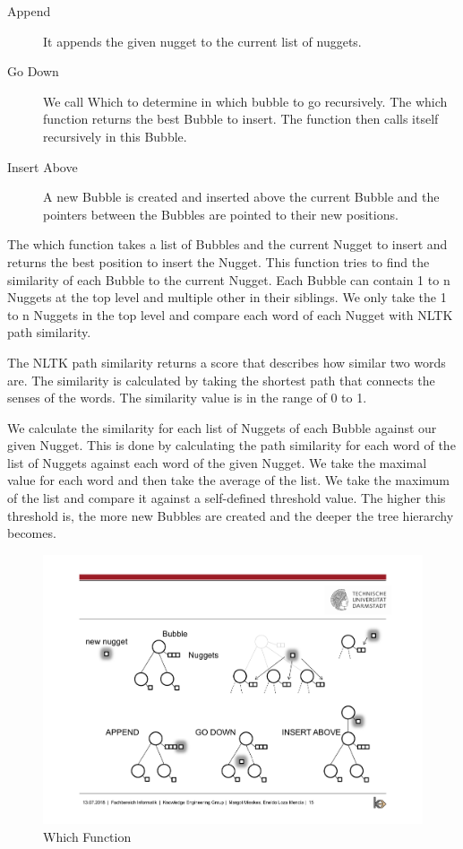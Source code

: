 \begin{description}
\item [Append] It appends the given nugget to the current list of nuggets.
\item [Go Down] We call Which to determine in which bubble to go recursively. The which function returns the best Bubble to insert. The function then calls itself recursively in this Bubble.
\item [Insert Above] A new Bubble is created and inserted above the current Bubble and the pointers between the Bubbles are pointed to their new positions.
\end{description}


The which function takes a list of Bubbles and the current Nugget to insert and returns the best position to insert the Nugget. This function tries to find the similarity of each Bubble to the current Nugget. Each Bubble can contain 1 to n Nuggets at the top level and multiple other in their siblings. We only take the 1 to n Nuggets in the top level and compare each word of each Nugget with NLTK path similarity.

The NLTK path similarity returns a score that describes how similar two words are. The similarity is calculated by taking the shortest path that connects the senses of the words. The similarity value is in the range of 0 to 1.

We calculate the similarity for each list of Nuggets of each Bubble against our given Nugget. This is done by calculating the path similarity for each word of the list of Nuggets against each word of the given Nugget. We take the maximal value for each word and then take the average of the list. We take the maximum of the list and compare it against a self-defined threshold value. The higher this threshold is, the more new Bubbles are created and the deeper the tree hierarchy becomes.


\begin{figure}[H]
	\centering
	\includegraphics[trim=14cm 10cm 7cm 5.5cm, clip=true]{img/step2_func.pdf}
	\caption{Which Function}
	\label{fig:which}
\end{figure}

